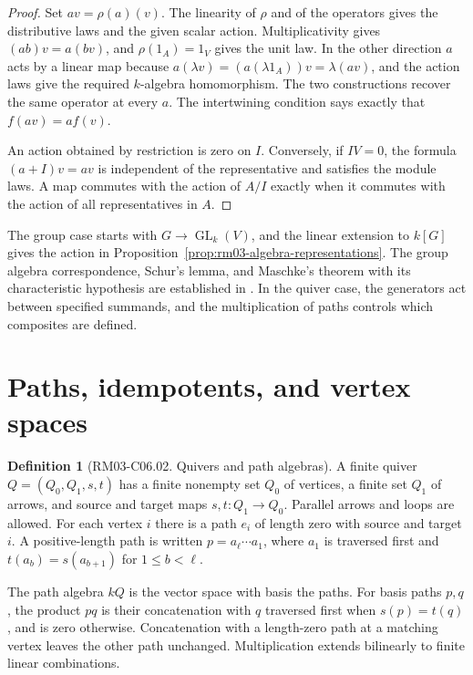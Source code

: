 \documentclass[11pt,oneside,openany]{book}
\theoremstyle{definition}
\newtheorem{definition}[theorem]{Definition}
\theoremstyle{remark}
\begin{document}
\begin{proof}
Set \(av=\rho(a)(v)\). The linearity of \(\rho\) and of the operators
gives the distributive laws and the given scalar action.
Multiplicativity gives \((ab)v=a(bv)\), and \(\rho(1_A)=1_V\) gives
the unit law. In the other direction \(a\) acts by a linear map
because \(a(\lambda v)=(a(\lambda 1_A))v=\lambda(av)\), and the
action laws give the required \(k\)-algebra homomorphism. The two
constructions recover the same operator at every \(a\). The
intertwining condition says exactly that \(f(av)=af(v)\).

An action obtained by restriction is zero on \(I\). Conversely, if
\(IV=0\), the formula \((a+I)v=av\) is independent of the
representative and satisfies the module laws. A map commutes with the
action of \(A/I\) exactly when it commutes with the action of all
representatives in \(A\).
\end{proof}

The group case starts with \(G\to\operatorname{GL}_k(V)\), and the
linear extension to \(k[G]\) gives the action in
Proposition~\ref{prop:rm03-algebra-representations}. The group algebra
correspondence, Schur's lemma, and Maschke's theorem with its
characteristic hypothesis are established in
\cite[Ch.~8]{p103}. In the quiver case, the generators act between
specified summands, and the multiplication of paths controls which
composites are defined.

\section{Paths, idempotents, and vertex spaces}

\begin{definition}[RM03-C06.02. Quivers and path algebras]
\label{def:rm03-path-algebra}
A finite quiver \(Q=(Q_0,Q_1,s,t)\) has a finite nonempty set
\(Q_0\) of vertices, a finite set \(Q_1\) of arrows, and source and
target maps \(s,t\colon Q_1\to Q_0\). Parallel arrows and loops are
allowed. For each vertex \(i\) there is a path \(e_i\) of length zero
with source and target \(i\). A positive-length path is written
\(p=a_\ell\cdots a_1\), where \(a_1\) is traversed first and
\(t(a_b)=s(a_{b+1})\) for \(1\leq b<\ell\).

The path algebra \(kQ\) is the vector space with basis the paths.
For basis paths \(p,q\), the product \(pq\) is their concatenation
with \(q\) traversed first when \(s(p)=t(q)\), and is zero
otherwise. Concatenation with a length-zero path at a matching
vertex leaves the other path unchanged. Multiplication extends
bilinearly to finite linear combinations.
\end{definition}
\end{document}
